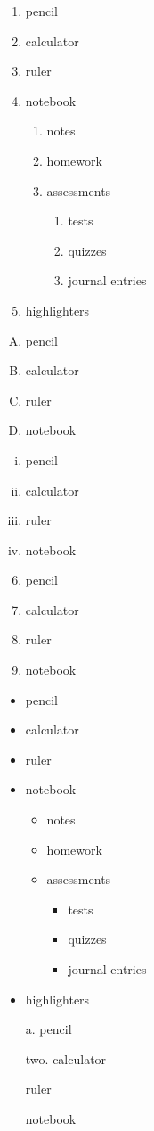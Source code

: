 \documentclass[12pt]{article}
\begin{document}
\begin{enumerate}
\item pencil
\item calculator
\item ruler
\item notebook
	\begin{enumerate}
	\item notes
	\item homework
	\item assessments
		\begin{enumerate}
		\item tests
		\item quizzes
		\item journal entries
		\end{enumerate}
	\end{enumerate}
\item highlighters
\end{enumerate}

\begin{enumerate}[A.]
\item pencil
\item calculator
\item ruler
\item notebook
\end{enumerate}

\begin{enumerate}[i.]
\item pencil
\item calculator
\item ruler
\item notebook
\end{enumerate}

\begin{enumerate} \setcounter{enumi}{5}
\item pencil
\item calculator
\item ruler
\item notebook
\end{enumerate}

\pagebreak

\begin{itemize}
\item pencil
\item calculator
\item ruler
\item notebook
	\begin{itemize}
	\item notes
	\item homework
	\item assessments
		\begin{itemize}
		\item tests
		\item quizzes
		\item journal entries
		\end{itemize}
	\end{itemize}
\item highlighters
\end{itemize}

\vspace{1cm}

\begin{enumerate}
\item[a.] pencil
\item[two.] calculator
\item[] ruler
\item[] notebook
\end{enumerate}
\end{document}
